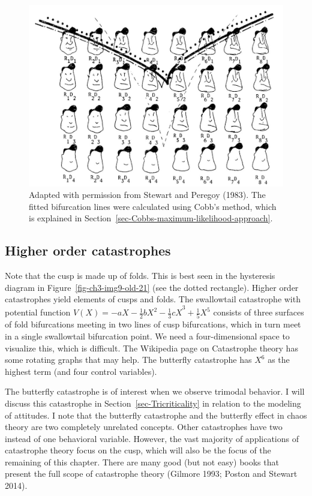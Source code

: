 \documentclass[
  a4paper,
  DIV=11,
  numbers=noendperiod,
  oneside]{scrreprt}
\begin{document}
\begin{figure}

{\centering \includegraphics{media/ch3/image14.jpg}

}

\caption{\label{fig-ch3-img14-old-26}Adapted with permission from
Stewart and Peregoy (1983). The fitted bifurcation lines were calculated
using Cobb's method, which is explained in
Section~\ref{sec-Cobbs-maximum-likelihood-approach}.}

\end{figure}

\hypertarget{sec-Higher-order-catastrophes}{%
\subsection{Higher order
catastrophes}\label{sec-Higher-order-catastrophes}}

Note that the cusp is made up of folds. This is best seen in the
hysteresis diagram in Figure~\ref{fig-ch3-img9-old-21} (see the dotted
rectangle). Higher order catastrophes yield elements of cusps and folds.
The swallowtail catastrophe with potential function
\(V(X) = {- aX - \frac{1}{2}bX^{2} - \frac{1}{3}cX}^{3} + \frac{1}{5}X^{5}\)
consists of three surfaces of fold bifurcations meeting in two lines of
cusp bifurcations, which in turn meet in a single swallowtail
bifurcation point. We need a four-dimensional space to visualize this,
which is difficult. The Wikipedia page on Catastrophe theory has some
rotating graphs that may help. The butterfly catastrophe has \(X^{6}\)
as the highest term (and four control variables).

The butterfly catastrophe is of interest when we observe trimodal
behavior. I will discuss this catastrophe in
Section~\ref{sec-Tricriticality} in relation to the modeling of
attitudes. I note that the butterfly catastrophe and the butterfly
effect in chaos theory are two completely unrelated concepts. Other
catastrophes have two instead of one behavioral variable. However, the
vast majority of applications of catastrophe theory focus on the cusp,
which will also be the focus of the remaining of this chapter. There are
many good (but not easy) books that present the full scope of
catastrophe theory (Gilmore 1993; Poston and Stewart 2014).
\end{document}

